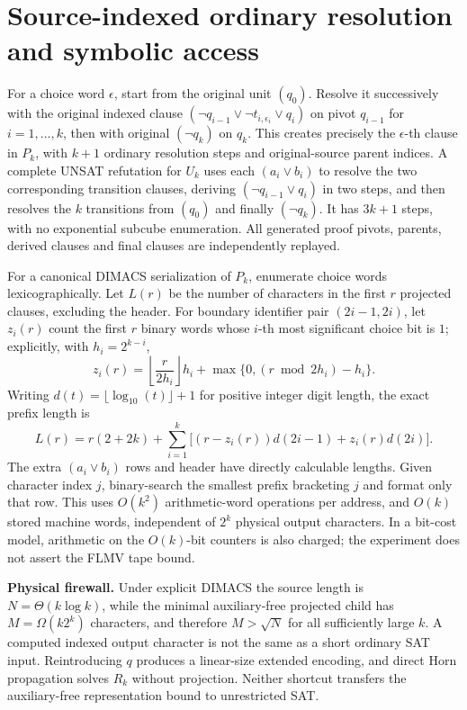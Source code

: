 \documentclass[11pt]{article}
\begin{document}
\section{Source-indexed ordinary resolution and symbolic access}
For a choice word $\epsilon$, start from the original unit $(q_0)$. Resolve it successively with the original indexed clause $(\neg q_{i-1}\lor\neg t_{i,\epsilon_i}\lor q_i)$ on pivot $q_{i-1}$ for $i=1,\ldots,k$, then with original $(\neg q_k)$ on $q_k$. This creates precisely the $\epsilon$-th clause in $P_k$, with $k+1$ ordinary resolution steps and original-source parent indices. A complete UNSAT refutation for $U_k$ uses each $(a_i\lor b_i)$ to resolve the two corresponding transition clauses, deriving $(\neg q_{i-1}\lor q_i)$ in two steps, and then resolves the $k$ transitions from $(q_0)$ and finally $(\neg q_k)$. It has $3k+1$ steps, with no exponential subcube enumeration. All generated proof pivots, parents, derived clauses and final clauses are independently replayed.

For a canonical DIMACS serialization of $P_k$, enumerate choice words lexicographically. Let $L(r)$ be the number of characters in the first $r$ projected clauses, excluding the header. For boundary identifier pair $(2i-1,2i)$, let $z_i(r)$ count the first $r$ binary words whose $i$-th most significant choice bit is $1$; explicitly, with $h_i=2^{k-i}$,
\[
z_i(r)=\left\lfloor\frac{r}{2h_i}\right\rfloor h_i +
\max\{0,(r\bmod 2h_i)-h_i\}.
\]
Writing $d(t)=\lfloor\log_{10}(t)\rfloor+1$ for positive integer digit length, the exact prefix length is
\[
L(r)=r(2+2k)+\sum_{i=1}^k\big[(r-z_i(r))d(2i-1)+z_i(r)d(2i)\big].
\]
The extra $(a_i\lor b_i)$ rows and header have directly calculable lengths. Given character index $j$, binary-search the smallest prefix bracketing $j$ and format only that row. This uses $O(k^2)$ arithmetic-word operations per address, and $O(k)$ stored machine words, independent of $2^k$ physical output characters. In a bit-cost model, arithmetic on the $O(k)$-bit counters is also charged; the experiment does not assert the FLMV tape bound.

\noindent\textbf{Physical firewall.} Under explicit DIMACS the source length is $N=\Theta(k\log k)$, while the minimal auxiliary-free projected child has $M=\Omega(k2^k)$ characters, and therefore $M>\sqrt N$ for all sufficiently large $k$. A computed indexed output character is not the same as a short ordinary SAT input. Reintroducing $q$ produces a linear-size extended encoding, and direct Horn propagation solves $R_k$ without projection. Neither shortcut transfers the auxiliary-free representation bound to unrestricted SAT.
\end{document}
